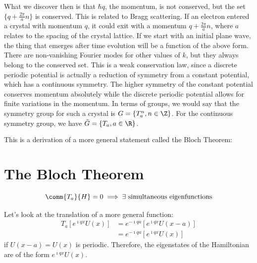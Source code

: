 \documentclass[a4paper,twoside,master.tex]{subfiles}
\begin{document}
What we discover then is that $ \hbar q $, the momentum, is not conserved, but the set $ \{q + \frac{2 \pi}{a} n\} $ is conserved. This is related to Bragg scattering. If an electron entered a crystal with momentum $ q $, it could exit with a momentum $ q + \frac{2 \pi}{a} n $, where $ a $ relates to the spacing of the crystal lattice. If we start with an initial plane wave, the thing that emerges after time evolution will be a function of the above form. There are non-vanishing Fourier modes for other values of $ k $, but they always belong to the conserved set. This is a weak conservation law, since a discrete periodic potential is actually a reduction of symmetry from a constant potential, which has a continuous symmetry. The higher symmetry of the constant potential conserves momentum absolutely while the discrete periodic potential allows for finite variations in the momentum. In terms of groups, we would say that the symmetry group for such a crystal is $ G = \{T_a^n, n \in \Z\} $. For the continuous symmetry group, we have $ \tilde{G} = \{T_a, a \in \R\} $.

This is a derivation of a more general statement called the Bloch Theorem:
\section{The Bloch Theorem}
\label{sec:the_bloch_theorem}
\begin{theorem}
    \begin{equation}
        \comm{T_a}{H} = 0 \implies \exists \text{ simultaneous eigenfunctions}
    \end{equation}
\end{theorem}

Let's look at the translation of a more general function:
\begin{align}
    T_a \left[ e^{\imath q x} U(x) \right] &=  e^{-\imath q a} \left[ e^{\imath qx} U(x-a) \right]\\
    &= e^{-\imath qa} \left[ e^{\imath q x} U(x) \right]
\end{align}
if $ U(x-a) = U(x) $ is periodic. Therefore, the eigenstates of the Hamiltonian are of the form $ e^{\imath qx} U(x) $.
\end{document}
